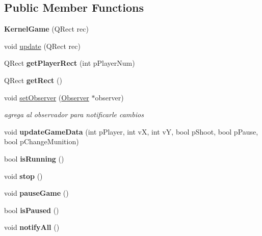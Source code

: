 \subsection*{Public Member Functions}
\begin{DoxyCompactItemize}
\item 
\hypertarget{class_kernel_game_a8d0a3d38bb42bc8ba160f83d9555f395}{{\bfseries Kernel\-Game} (Q\-Rect rec)}\label{class_kernel_game_a8d0a3d38bb42bc8ba160f83d9555f395}

\item 
void \hyperlink{class_kernel_game_ae621056ebdaf542603f970d35843f496}{update} (Q\-Rect rec)
\item 
\hypertarget{class_kernel_game_a6c6c09460150307cff306ba8edb8f56d}{Q\-Rect {\bfseries get\-Player\-Rect} (int p\-Player\-Num)}\label{class_kernel_game_a6c6c09460150307cff306ba8edb8f56d}

\item 
\hypertarget{class_kernel_game_a1867078077d9bc0bed5ea8dc783e5d4a}{Q\-Rect {\bfseries get\-Rect} ()}\label{class_kernel_game_a1867078077d9bc0bed5ea8dc783e5d4a}

\item 
void \hyperlink{class_kernel_game_a57642ef798e299e27b18c392fbba563f}{set\-Observer} (\hyperlink{class_observer}{Observer} $\ast$observer)
\begin{DoxyCompactList}\small\item\em agrega al observador para notificarle cambios \end{DoxyCompactList}\item 
\hypertarget{class_kernel_game_a06ed912339d619fa11c246f71e6b5ce9}{void {\bfseries update\-Game\-Data} (int p\-Player, int v\-X, int v\-Y, bool p\-Shoot, bool p\-Pause, bool p\-Change\-Munition)}\label{class_kernel_game_a06ed912339d619fa11c246f71e6b5ce9}

\item 
\hypertarget{class_kernel_game_a739246ac9cc611c114c4e1557c5da966}{bool {\bfseries is\-Running} ()}\label{class_kernel_game_a739246ac9cc611c114c4e1557c5da966}

\item 
\hypertarget{class_kernel_game_ac5ed06e95095ddb80282fb15a4c843e3}{void {\bfseries stop} ()}\label{class_kernel_game_ac5ed06e95095ddb80282fb15a4c843e3}

\item 
\hypertarget{class_kernel_game_ab5a6993563f54d08ac85de2675e67395}{void {\bfseries pause\-Game} ()}\label{class_kernel_game_ab5a6993563f54d08ac85de2675e67395}

\item 
\hypertarget{class_kernel_game_ac543f811a6f50aed646502dc35f875d2}{bool {\bfseries is\-Paused} ()}\label{class_kernel_game_ac543f811a6f50aed646502dc35f875d2}

\item 
\hypertarget{class_kernel_game_afb01399b1b5d0e8b8bbbfb84466a7d20}{void {\bfseries notify\-All} ()}\label{class_kernel_game_afb01399b1b5d0e8b8bbbfb84466a7d20}

\end{DoxyCompactItemize}
